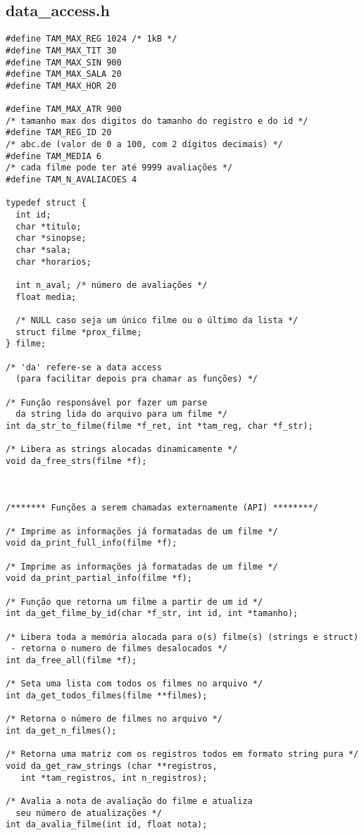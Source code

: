 \documentclass[11pt,twoside]{article}
\begin{document}
\subsection{data\_access.h} %
\begin{verbatim}
#define TAM_MAX_REG 1024 /* 1kB */
#define TAM_MAX_TIT 30
#define TAM_MAX_SIN 900
#define TAM_MAX_SALA 20
#define TAM_MAX_HOR 20

#define TAM_MAX_ATR 900
/* tamanho max dos digitos do tamanho do registro e do id */
#define TAM_REG_ID 20 
/* abc.de (valor de 0 a 100, com 2 dígitos decimais) */
#define TAM_MEDIA 6 
/* cada filme pode ter até 9999 avaliações */
#define TAM_N_AVALIACOES 4 

typedef struct {
  int id;
  char *titulo;
  char *sinopse;
  char *sala;
  char *horarios;
  
  int n_aval; /* número de avaliações */
  float media;

  /* NULL caso seja um único filme ou o último da lista */
  struct filme *prox_filme; 
} filme;

/* 'da' refere-se a data access 
  (para facilitar depois pra chamar as funções) */

/* Função responsável por fazer um parse 
  da string lida do arquivo para um filme */
int da_str_to_filme(filme *f_ret, int *tam_reg, char *f_str);

/* Libera as strings alocadas dinamicamente */
void da_free_strs(filme *f);



/******* Funções a serem chamadas externamente (API) ********/

/* Imprime as informações já formatadas de um filme */
void da_print_full_info(filme *f);

/* Imprime as informações já formatadas de um filme */
void da_print_partial_info(filme *f);

/* Função que retorna um filme a partir de um id */
int da_get_filme_by_id(char *f_str, int id, int *tamanho);

/* Libera toda a memória alocada para o(s) filme(s) (strings e struct) 
 - retorna o numero de filmes desalocados */
int da_free_all(filme *f);

/* Seta uma lista com todos os filmes no arquivo */
int da_get_todos_filmes(filme **filmes);

/* Retorna o número de filmes no arquivo */
int da_get_n_filmes();

/* Retorna uma matriz com os registros todos em formato string pura */
void da_get_raw_strings (char **registros,
   int *tam_registros, int n_registros);

/* Avalia a nota de avaliação do filme e atualiza 
  seu número de atualizações */
int da_avalia_filme(int id, float nota);
\end{verbatim}
\end{document}
